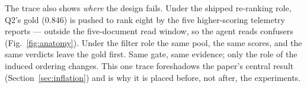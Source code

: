 The trace also shows \emph{where} the design fails. Under the shipped
re-ranking role, Q2's gold (0.846) is pushed to rank eight by the five
higher-scoring telemetry reports --- outside the five-document read window, so
the agent reads confusers (Fig.~\ref{fig:anatomy}). Under the filter role the
same pool, the same scores, and the same verdicts leave the gold first. Same
gate, same evidence; only the role of the induced ordering changes. This one
trace foreshadows the paper's central result
(Section~\ref{sec:inflation}) and is why it is placed before, not after, the
experiments.

